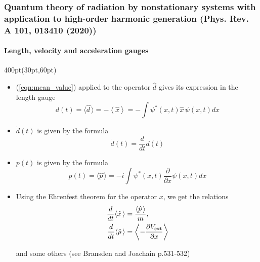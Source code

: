 \begin{frame}
\frametitle{Quantum theory of radiation by nonstationary systems 
	with application to high-order harmonic generation
        (Phys. Rev. A 101, 013410 (2020))}
	\framesubtitle{Length, velocity and acceleration gauges}

\begin{textblock*}{400pt}(30pt,60pt)
\footnotesize
\begin{itemize}
\item (\ref{eqn:mean_value}) applied to the operator $\hat{d}$ gives
its expression in the length gauge
\begin{equation}
d(t) = \langle \hat{d\,} \rangle = - \left\langle\hat{x}\right\rangle
  = - \int \psi^{*}(x,t)\hat{x}\,\psi(x,t)dx
\end{equation}

\item $\dot{d}(t)$ is given by the formula
\begin{equation}
\dot{d}(t) = \frac{d}{dt}d(t)
\end{equation}

\item $p(t)$ is given by the formula
\begin{equation}
p(t) = \langle \hat{p\,} \rangle  
  = - i\int \psi^{*}(x,t)\frac{\partial}{\partial x}\psi(x,t)dx
\end{equation}

\item Using the Ehrenfest theorem for the operator $x$, we get the relations 
\begin{align}
\frac{d}{dt}\langle \hat{x\,} \rangle 
        & = \frac{\langle \hat{p\,} \rangle}{m}, \\
\frac{d}{dt} \langle \hat{p\,}\rangle 
        & = \left\langle -\frac{\partial V_{\rm ext}}{\partial x} \right\rangle
\end{align}

and some others (see Bransden and Joachain p.531-532) 



\end{itemize}
\end{textblock*}


\end{frame}




